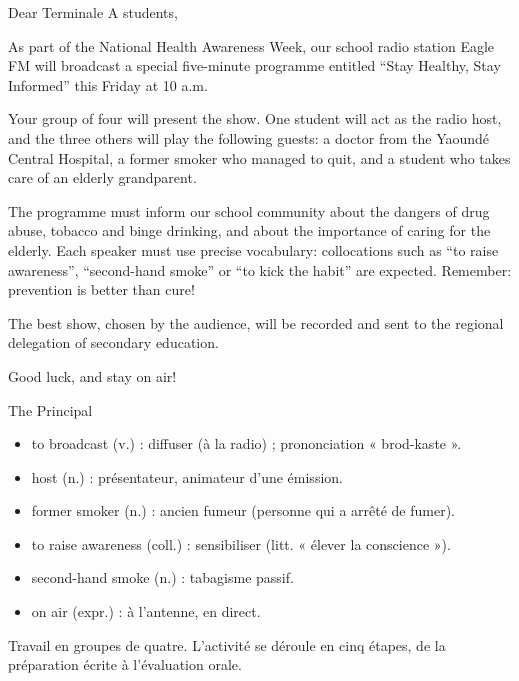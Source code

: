 \documentclass[11pt]{article}
\newcommand{\cle}[1]{{\popxbold\color{popdark}#1}}
\newcounter{popsec}
\newcounter{popsub}
\newcommand{\courssub}[1]{%
  \stepcounter{popsub}%
  \par\vspace{9pt}\noindent{\popxbold\fontsize{11.5}{13}\selectfont\color{popink}{\color{poporange}\thepopsec.\thepopsub}\hspace{6pt}#1}\par\nopagebreak\vspace{4pt}
}
\begin{document}
\begin{textebox}
Dear Terminale A students,

As part of the National Health Awareness Week, our school radio station Eagle FM will broadcast a special five-minute programme entitled “Stay Healthy, Stay Informed” this Friday at 10 a.m.

Your group of four will present the show. One student will act as the radio host, and the three others will play the following guests: a doctor from the Yaoundé Central Hospital, a former smoker who managed to quit, and a student who takes care of an elderly grandparent.

The programme must inform our school community about the dangers of drug abuse, tobacco and binge drinking, and about the importance of caring for the elderly. Each speaker must use precise vocabulary: collocations such as “to raise awareness”, “second-hand smoke” or “to kick the habit” are expected. Remember: prevention is better than cure!

The best show, chosen by the audience, will be recorded and sent to the regional delegation of secondary education.

Good luck, and stay on air!

The Principal
\end{textebox}

\begin{definition}
\begin{itemize}
\item \cle{to broadcast} (v.) : diffuser (à la radio) ; prononciation « brod-kaste ».
\item \cle{host} (n.) : présentateur, animateur d'une émission.
\item \cle{former smoker} (n.) : ancien fumeur (personne qui a arrêté de fumer).
\item \cle{to raise awareness} (coll.) : sensibiliser (litt. « élever la conscience »).
\item \cle{second-hand smoke} (n.) : tabagisme passif.
\item \cle{on air} (expr.) : à l'antenne, en direct.
\end{itemize}
\end{definition}

\courssub{Consignes}

Travail en groupes de quatre. L'activité se déroule en cinq étapes, de la préparation écrite à l'évaluation orale.
\end{document}
